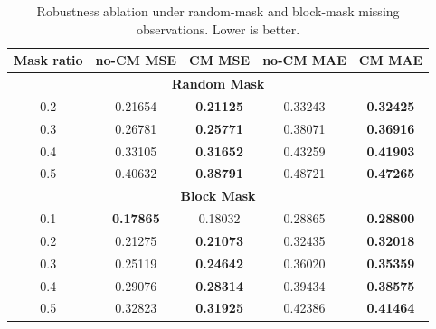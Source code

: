 \begin{table}[htb]
\renewcommand{\arraystretch}{1.05}
\caption{Robustness ablation under random-mask and block-mask missing observations. Lower is better.}
\label{tab:missing_ablation}
\centering
\scriptsize
\setlength{\tabcolsep}{4pt}
\begin{tabular}{@{}ccccc@{}}
\toprule
Mask ratio & no-CM MSE & CM MSE & no-CM MAE & CM MAE \\
\midrule
\multicolumn{5}{c}{\textbf{Random Mask}} \\
\midrule
0.2 & 0.21654 & \textbf{0.21125} & 0.33243 & \textbf{0.32425} \\
0.3 & 0.26781 & \textbf{0.25771} & 0.38071 & \textbf{0.36916} \\
0.4 & 0.33105 & \textbf{0.31652} & 0.43259 & \textbf{0.41903} \\
0.5 & 0.40632 & \textbf{0.38791} & 0.48721 & \textbf{0.47265} \\
\midrule
\multicolumn{5}{c}{\textbf{Block Mask}} \\
\midrule
0.1 & \textbf{0.17865} & 0.18032 & 0.28865 & \textbf{0.28800} \\
0.2 & 0.21275 & \textbf{0.21073} & 0.32435 & \textbf{0.32018} \\
0.3 & 0.25119 & \textbf{0.24642} & 0.36020 & \textbf{0.35359} \\
0.4 & 0.29076 & \textbf{0.28314} & 0.39434 & \textbf{0.38575} \\
0.5 & 0.32823 & \textbf{0.31925} & 0.42386 & \textbf{0.41464} \\
\bottomrule
\end{tabular}
\end{table}
